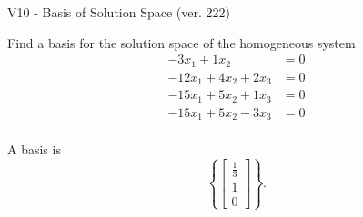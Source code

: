 \begin{exercise}
  \begin{exerciseTitle}V10 - Basis of Solution Space (ver. 222)\end{exerciseTitle}
  \begin{exerciseStatement}
    Find a basis for the solution space of the homogeneous system 
\begin{align*}
 -3 x_ 1 + 1 x_ 2 &= 0  \\ 
  -12 x_ 1 + 4 x_ 2 + 2 x_ 3 &= 0  \\ 
  -15 x_ 1 + 5 x_ 2 + 1 x_ 3 &= 0  \\ 
  -15 x_ 1 + 5 x_ 2 -3 x_ 3 &= 0  \\ 
 \end{align*}


 
  \end{exerciseStatement}

  \begin{exerciseAnswer}
   A basis is   
\[\left\{\left[\begin{array}{c}
\frac{1}{3} \\
1 \\
0
\end{array}\right]\right\}.\]

  


  \end{exerciseAnswer}
\end{exercise}